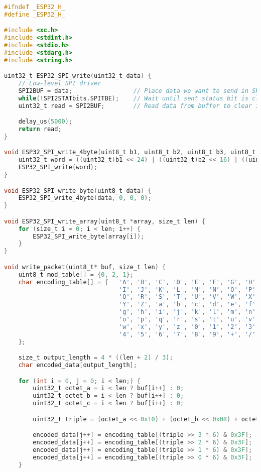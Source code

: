 \begin{lstlisting}[language=C]

#ifndef _ESP32_H_
#define _ESP32_H_

#include <xc.h>
#include <stdint.h>
#include <stdio.h>
#include <stdarg.h>
#include <string.h>

uint32_t ESP32_SPI_write(uint32_t data) {
    // Low-level SPI driver
    SPI2BUF = data;                 // Place data we want to send in SPI buffer
    while(!SPI2STATbits.SPITBE);    // Wait until sent status bit is cleared
    uint32_t read = SPI2BUF;        // Read data from buffer to clear it

    delay_us(5000);
    return read;
}

void ESP32_SPI_write_4byte(uint8_t b1, uint8_t b2, uint8_t b3, uint8_t b4) {
    uint32_t word = ((uint32_t)b1 << 24) | ((uint32_t)b2 << 16) | ((uint32_t)b3 << 8) | (uint32_t)b4;
    ESP32_SPI_write(word);
}

void ESP32_SPI_write_byte(uint8_t data) {
    ESP32_SPI_write_4byte(data, 0, 0, 0);
}

void ESP32_SPI_write_array(uint8_t *array, size_t len) {
    for (size_t i = 0; i < len; i++) {
        ESP32_SPI_write_byte(array[i]);
    }
}

void write_packet(uint8_t* buf, size_t len) {
    uint8_t mod_table[] = {0, 2, 1};
    char encoding_table[] = {   'A', 'B', 'C', 'D', 'E', 'F', 'G', 'H',
                                'I', 'J', 'K', 'L', 'M', 'N', 'O', 'P',
                                'Q', 'R', 'S', 'T', 'U', 'V', 'W', 'X',
                                'Y', 'Z', 'a', 'b', 'c', 'd', 'e', 'f',
                                'g', 'h', 'i', 'j', 'k', 'l', 'm', 'n',
                                'o', 'p', 'q', 'r', 's', 't', 'u', 'v',
                                'w', 'x', 'y', 'z', '0', '1', '2', '3',
                                '4', '5', '6', '7', '8', '9', '+', '/'
    };

    size_t output_length = 4 * ((len + 2) / 3);
    char encoded_data[output_length];

    for (int i = 0, j = 0; i < len;) {
        uint32_t octet_a = i < len ? buf[i++] : 0;
        uint32_t octet_b = i < len ? buf[i++] : 0;
        uint32_t octet_c = i < len ? buf[i++] : 0;

        uint32_t triple = (octet_a << 0x10) + (octet_b << 0x08) + octet_c;

        encoded_data[j++] = encoding_table[(triple >> 3 * 6) & 0x3F];
        encoded_data[j++] = encoding_table[(triple >> 2 * 6) & 0x3F];
        encoded_data[j++] = encoding_table[(triple >> 1 * 6) & 0x3F];
        encoded_data[j++] = encoding_table[(triple >> 0 * 6) & 0x3F];
    }


\end{lstlisting}
